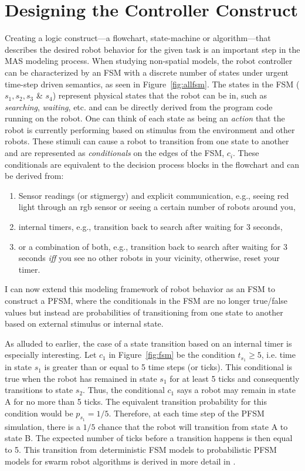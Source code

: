 \documentclass[defaultstyle,12pt]{thesis}
\begin{document}
\section{Designing the Controller Construct}
Creating a logic construct---a flowchart, state-machine or algorithm---that describes the desired robot behavior for the given task is an important step in the MAS modeling process. When studying non-spatial models, the robot controller can be characterized by an FSM with a discrete number of states under urgent time-step driven semantics, as seen in Figure~\ref{fig:allfsm}. The states in the FSM ($s_1, s_2, s_3$ \& $s_4$) represent physical states that the robot can be in, such as  \emph{searching}, \emph{waiting}, etc. and can be directly derived from the program code running on the robot. One can think of each state as being an \emph{action} that the robot is currently performing based on stimulus from the environment and other robots. These stimuli can cause a robot to transition from one state to another and are represented as \emph{conditionals} on the edges of the FSM, $c_i$. These conditionals are equivalent to the decision process blocks in the flowchart and can be derived from:
\begin{enumerate}
\item Sensor readings (or stigmergy) and explicit communication, e.g., seeing red light through an rgb sensor or seeing a certain number of robots around you,
\item internal timers, e.g., transition back to search after waiting for 3 seconds,
\item or a combination of both, e.g., transition back to search after waiting for 3 seconds \emph{iff} you see no other robots in your vicinity, otherwise, reset your timer.
\end{enumerate}

I can now extend this modeling framework of robot behavior as an FSM to construct a PFSM, where the conditionals in the FSM are no longer true/false values but instead are probabilities of transitioning from one state to another based on external stimulus or internal state. 

As alluded to earlier, the case of a state transition based on an internal timer is especially interesting. Let $c_1$ in Figure~\ref{fig:fsm} be the condition $t_{s_1} \geq 5$, i.e. time in state $s_1$ is greater than or equal to 5 time steps (or ticks). This conditional is true when the robot has remained in state $s_1$ for at least 5 ticks and consequently transitions to state $s_2$. Thus, the conditional $c_1$ says a robot may remain in state A for no more than 5 ticks. The equivalent transition probability for this condition would be $p_{s_1} = 1/5$. Therefore, at each time step of the PFSM simulation, there is a $1/5$ chance that the robot will transition from state A to state B. The expected number of ticks before a transition happens is then equal to 5. This transition from deterministic FSM models to probabilistic PFSM models for swarm robot algorithms is derived in more detail in \cite{Correll2007}.
\end{document}
